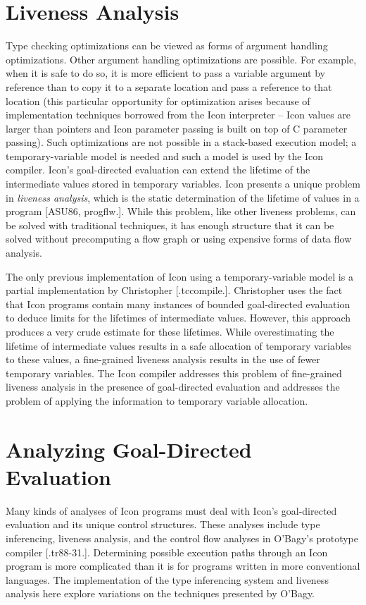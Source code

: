\section{Liveness Analysis }

Type checking optimizations can be viewed as forms of argument
handling optimizations. Other argument handling optimizations are
possible. For example, when it is safe to do so, it is more efficient
to pass a variable argument by reference than to copy it to a separate
location and pass a reference to that location (this particular
opportunity for optimization arises because of implementation
techniques borrowed from the Icon interpreter -- Icon values are
larger than pointers and Icon parameter passing is built on top of C
parameter passing). Such optimizations are not possible in a
stack-based execution model; a temporary-variable model is needed and
such a model is used by the Icon compiler.  Icon's goal-directed
evaluation can extend the lifetime of the intermediate values stored
in temporary variables. Icon presents a unique problem in
\textit{liveness analysis}, which is the static determination of the
lifetime of values in a program [ASU86, progflw.]. While this problem,
like other liveness problems, can be solved with traditional
techniques, it has enough structure that it can be solved without
precomputing a flow graph or using expensive forms of data flow
analysis.


The only previous implementation of Icon using a temporary-variable
model is a partial implementation by Christopher
[.tccompile.]. Christopher uses the fact that Icon programs contain
many instances of bounded goal-directed evaluation to deduce limits
for the lifetimes of intermediate values. However, this approach
produces a very crude estimate for these lifetimes. While
overestimating the lifetime of intermediate values results in a safe
allocation of temporary variables to these values, a fine-grained
liveness analysis results in the use of fewer temporary variables. The
Icon compiler addresses this problem of fine-grained liveness analysis
in the presence of goal-directed evaluation and addresses the problem
of applying the information to temporary variable allocation.

\section{Analyzing Goal-Directed Evaluation}

Many kinds of analyses of Icon programs must deal with Icon's
goal-directed evaluation and its unique control structures. These
analyses include type inferencing, liveness analysis, and the control
flow analyses in O'Bagy's prototype compiler [.tr88-31.]. Determining
possible execution paths through an Icon program is more complicated
than it is for programs written in more conventional languages. The
implementation of the type inferencing system and liveness analysis
here explore variations on the techniques presented by O'Bagy.

